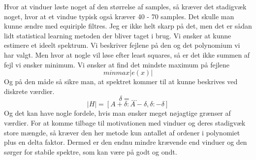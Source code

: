 \begin{Motivationer}
\begin{Motivation}
    \end{Motivation}
    \begin{Motivation}
        Hvor at vinduer løste noget af den størrelse af samples, så kræver det stadigvæk noget, hvor at et vindue typisk også kræver 40 - 70 samples. 
        Det skulle man kunne ændre med equiriple filtres. Jeg er ikke helt skarp på det, men det er sådan lidt statistical learning metoden der bliver taget i brug. 
        Vi ønsker at kunne estimere et ideelt spektrum. Vi beskriver fejlene på den og det polynomium vi har valgt. Men hvor at nogle vil løse efter least squares, så er det ikke summen af fejl vi ønsker minimum. 
        Vi ønsker at find det mindste maximum på fejlene
        \[min max |e(x)|\]
        Og på den måde så sikre man, at spektret kommer til at kunne beskrives ved diskrete værdier. 
        \[\delta = ...\]
        \[|H| = [A + \delta: A - \delta, \delta : -\delta]\]
        Og det kan have nogle fordele, hvis man ønsker meget nøjagtige grænser af værdier.
        For at komme tilbage til motivationen med vinduer og deres stadigvæk store mængde, så kræver den her metode kun antallet af ordener i polynomiet plus en delta faktor. 
        Dermed er den endnu mindre krævende end vinduer og den sørger for stabile spektre, som kan være på godt og ondt.        
    \end{Motivation}
\end{Motivationer}